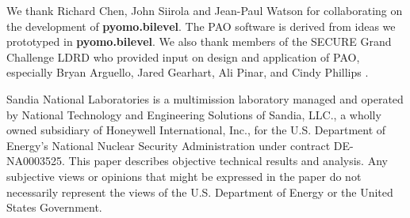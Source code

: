 We thank Richard Chen, John Siirola and Jean-Paul Watson for collaborating
on the development of \textbf{pyomo.bilevel}.  The PAO software is
derived from ideas we prototyped in \textbf{pyomo.bilevel}.  We also
thank members of the SECURE Grand Challenge LDRD who provided input on
design and application of PAO, especially Bryan Arguello, Jared Gearhart,
Ali Pinar, and Cindy Phillips .

Sandia National Laboratories is a multimission laboratory managed and
operated by National Technology and Engineering Solutions of Sandia,
LLC., a wholly owned subsidiary of Honeywell International, Inc., for
the U.S. Department of Energy's National Nuclear Security Administration
under contract DE-NA0003525.  This paper describes objective technical
results and analysis.  Any subjective views or opinions that might be
expressed in the paper do not necessarily represent the views of the
U.S. Department of Energy or the United States Government.
